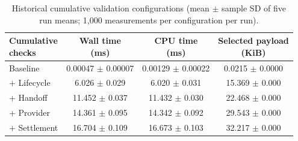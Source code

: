 \begin{table}[!t]
\centering
\caption{Historical cumulative validation configurations (mean $\pm$ sample SD of five run means; 1,000 measurements per configuration per run).}
\label{tab:f-cumulative-cost}
\footnotesize
\renewcommand{\arraystretch}{1.08}
\setlength{\tabcolsep}{3pt}
\begin{tabular*}{\columnwidth}{@{\hspace{3pt}}l@{\extracolsep{\fill}}ccc@{\hspace{3pt}}}
\toprule
\shortstack{\textbf{Cumulative}\\\textbf{checks}} & \shortstack{\textbf{Wall time}\\\textbf{(ms)}} & \shortstack{\textbf{CPU time}\\\textbf{(ms)}} & \shortstack{\textbf{Selected payload}\\\textbf{(KiB)}} \\
\midrule
Baseline & 0.00047 $\pm$ 0.00007 & 0.00129 $\pm$ 0.00022 & 0.0215 $\pm$ 0.0000 \\
+ Lifecycle & 6.026 $\pm$ 0.029 & 6.020 $\pm$ 0.031 & 15.369 $\pm$ 0.000 \\
+ Handoff & 11.452 $\pm$ 0.037 & 11.432 $\pm$ 0.030 & 22.468 $\pm$ 0.000 \\
+ Provider & 14.361 $\pm$ 0.095 & 14.342 $\pm$ 0.092 & 29.543 $\pm$ 0.000 \\
+ Settlement & 16.704 $\pm$ 0.109 & 16.673 $\pm$ 0.103 & 32.217 $\pm$ 0.000 \\
\bottomrule
\end{tabular*}
\end{table}
